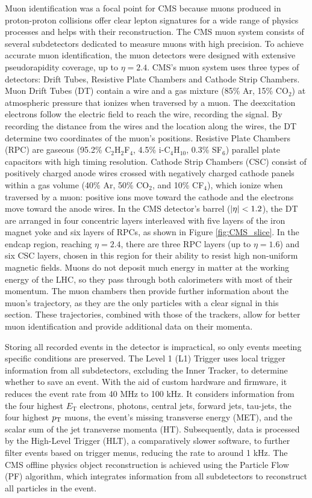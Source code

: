 Muon identification was a focal point for CMS because muons produced in proton-proton collisions offer clear lepton signatures for a wide range of physics processes and helps with their reconstruction. The CMS muon system consists of several subdetectors dedicated to measure muons with high precision. To achieve accurate muon identification, the muon detectors were designed with extensive pseudorapidity coverage, up to $\eta = 2.4$. CMS's muon system uses three types of detectors: Drift Tubes, Resistive Plate Chambers and Cathode Strip Chambers. Muon Drift Tubes (DT) contain a wire and a gas mixture (85\% Ar, 15\% CO$_2$) at atmospheric pressure that ionizes when traversed by a muon. The deexcitation electrons follow the electric field to reach the wire, recording the signal. By recording the distance from the wires and the location along the wires, the DT determine two coordinates of the muon's positions. Resistive Plate Chambers (RPC) are gaseous (95.2\% C$_2$H$_2$F$_4$, 4.5\% i-C$_4$H$_{10}$, 0.3\% SF$_6$) parallel plate capacitors with high timing resolution. Cathode Strip Chambers (CSC) consist of positively charged anode wires crossed with negatively charged cathode panels within a gas volume (40\% Ar, 50\% CO$_2$, and 10\% CF$_4$), which ionize when traversed by a muon: positive ions move toward the cathode and the electrons move toward the anode wires. In the CMS detector's barrel ($\left\lvert\eta\right\rvert < 1.2$), the DT are arranged in four concentric layers interleaved with five layers of the iron magnet yoke and six layers of RPCs, as shown in Figure \ref{fig:CMS_slice}. In the endcap region, reaching $\eta = 2.4$, there are three RPC layers (up to $\eta = 1.6$) and six CSC layers, chosen in this region for their ability to resist high non-uniform magnetic fields. Muons do not deposit much energy in matter at the working energy of the LHC, so they pass through both calorimeters with most of their momentum. The muon chambers then provide further information about the muon's trajectory, as they are the only particles with a clear signal in this section. These trajectories, combined with those of the trackers, allow for better muon identification and provide additional data on their momenta.

Storing all recorded events in the detector is impractical, so only events meeting specific conditions are preserved. The Level 1 (L1) Trigger uses local trigger information from all subdetectors, excluding the Inner Tracker, to determine whether to save an event. With the aid of custom hardware and firmware, it reduces the event rate from 40 MHz to 100 kHz. It considers information from the four highest $E_\text{T}$ electrons, photons, central jets, forward jets, tau-jets, the four highest $p_\text{T}$ muons, the event's missing transverse energy (MET), and the scalar sum of the jet transverse momenta (HT). Subsequently, data is processed by the High-Level Trigger (HLT), a comparatively slower software, to further filter events based on trigger menus, reducing the rate to around 1 kHz. The CMS offline physics object reconstruction is achieved using the Particle Flow (PF) algorithm, which integrates information from all subdetectors to reconstruct all particles in the event.

